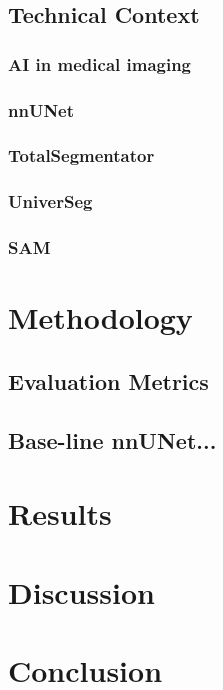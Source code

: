 \documentclass[12pt,twoside]{report}
\begin{document}

\section{Technical Context}
\subsection{AI in medical imaging}
\subsection{nnUNet}
\subsection{TotalSegmentator}
\subsection{UniverSeg}
\subsection{SAM}

\chapter{Methodology}

\section{Evaluation Metrics}
\section{Base-line nnUNet...}

\chapter{Results}

\chapter{Discussion}

\chapter{Conclusion}
\end{document}
